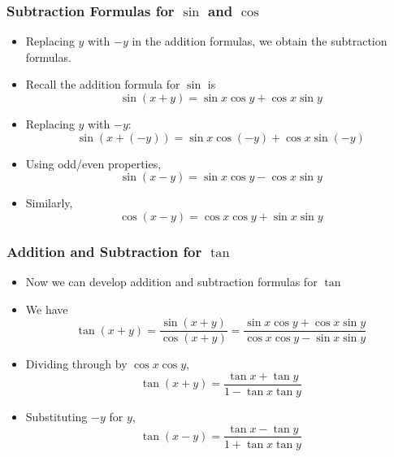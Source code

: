 \documentclass[serif,ignorenonframetext]{beamer}
\begin{document}
\begin{frame}
  \frametitle{Subtraction Formulas for $\sin$ and $\cos$}
  \begin{itemize}[<+->]
  \item Replacing $y$ with $-y$ in the addition formulas, we obtain
    the subtraction formulas.
  \item Recall the addition formula for $\sin$ is
    \begin{equation*}
      \sin(x+y) = \sin x \cos y + \cos x \sin y
    \end{equation*}
  \item Replacing $y$ with $-y$:
    \begin{equation*}
      \sin(x+(-y))=\sin x \cos(-y) + \cos x\sin(-y)
    \end{equation*}
  \item Using odd/even properties,
    \begin{equation*}
      \sin(x-y) = \sin x \cos y - \cos x \sin y
    \end{equation*}
  \item Similarly,
    \begin{equation*}
      \cos(x-y) = \cos x \cos y + \sin x \sin y
    \end{equation*}
  \end{itemize}
\end{frame}

\begin{frame}
  \frametitle{Addition and Subtraction for $\tan$}
  \begin{itemize}[<+->]
  \item Now we can develop addition and subtraction formulas for $\tan$
  \item We have
    \begin{equation*}
      \tan(x+y)=\frac{\sin(x+y)}{\cos(x+y)}
      = \frac{\sin x\cos y+\cos x\sin y}{\cos x\cos y-\sin x\sin y}
    \end{equation*}
  \item Dividing through by $\cos x\cos y$,
    \begin{equation*}
      \tan(x+y) = \frac{\tan x + \tan y}{1-\tan x \tan y}
    \end{equation*}
  \item Substituting $-y$ for $y$,
    \begin{equation*}
      \tan(x-y) = \frac{\tan x - \tan y}{1+\tan x \tan y}
    \end{equation*}
  \end{itemize}
\end{frame}
\end{document}
